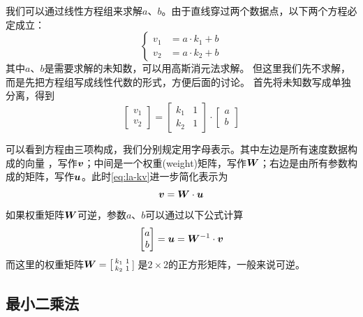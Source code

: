 我们可以通过线性方程组来求解$a$、$b$。由于直线穿过两个数据点，以下两个方程必定成立：
\begin{equation}
    \left\{
    \begin{aligned}
        v_1 &= a\cdot k_1 + b \\
        v_2 &= a\cdot k_2 + b
    \end{aligned}\right.
\end{equation}
其中$a$、$b$是需要求解的未知数，可以用高斯消元法求解。
但这里我们先不求解，而是先把方程组写成线性代数的形式，方便后面的讨论。
首先将未知数写成单独分离，得到
\begin{equation}\label{eq:la-kv}
    \begin{bmatrix}
        v_1\\
        v_2
    \end{bmatrix}=
    \begin{bmatrix}
        k_1 & 1\\
        k_2 & 1
    \end{bmatrix}\cdot
    \begin{bmatrix}
        a\\
        b
    \end{bmatrix}
\end{equation}

可以看到方程由三项构成，我们分别规定用字母表示。其中左边是所有速度数据构成的向量%
，写作$\bm{v}$；中间是一个权重(weight)矩阵，写作$\bm{W}$；右边是由所有参数构成的矩阵，写作$\bm{u}$。此时\cref{eq:la-kv}进一步简化表示为
\begin{equation}
    \bm{v}=\bm{W}\cdot\bm{u}
\end{equation}
如果权重矩阵$\bm{W}$可逆，参数$a$、$b$可以通过以下公式计算
\begin{equation}\label{eq:la-eq}
    \begin{bmatrix}
        a\\
        b
    \end{bmatrix}=
    \bm{u}=\bm{W}^{-1}\cdot\bm{v}
\end{equation}
而这里的权重矩阵$\bm{W}=\big[
\begin{smallmatrix}
    k_1 & 1\\
    k_2 & 1
\end{smallmatrix}$\big]
是$2\times2$的正方形矩阵，一般来说可逆。

\subsection{最小二乘法}


